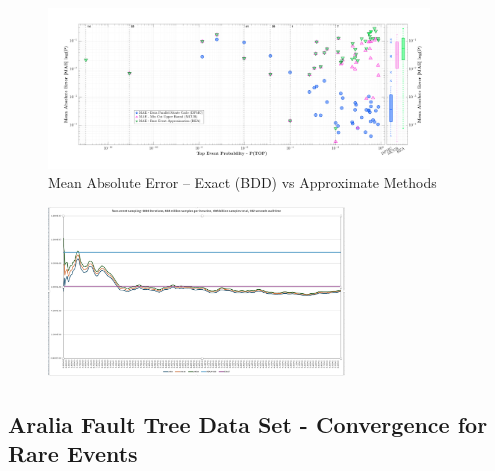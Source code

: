 \begin{frame}[allowframebreaks]
    \begin{figure}[h]
    \centering
    \includegraphics[width=0.9\textwidth]{4_casestudy/error_vs_prob_detailed.png}
    \caption{Mean Absolute Error – Exact (BDD) vs Approximate Methods}
    \label{fig:mae_vs_logp}
\end{figure}
\end{frame}

\begin{frame}[allowframebreaks]
    \begin{figure}[h]
    \centering
    \includegraphics[width=0.7\textwidth]{4_casestudy/rare-event.jpg}
    \label{fig:rare}
\end{figure}
\end{frame}


\subsection{Aralia Fault Tree Data Set - Convergence for Rare Events}
\begin{frame}[allowframebreaks]
    
\end{frame}

